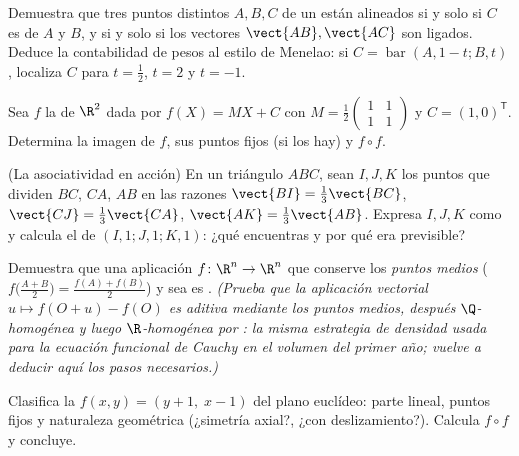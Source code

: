 \begin{exercise}[$\star$]\label{exo:b2:affine:2}
Demuestra que tres puntos distintos $A, B, C$ de un  están
alineados si y solo si $C$ es  de $A$ y $B$, y si y solo si
los vectores $\vect{AB}, \vect{AC}$ son ligados. Deduce la
contabilidad de pesos al estilo de Menelao: si $C =
\operatorname{bar}(A, 1 - t; B, t)$, localiza $C$ para $t =
\frac12$, $t = 2$ y $t = -1$.
\end{exercise}

\begin{exercise}[$\star$]\label{exo:b2:affine:3}
Sea $f$ la  de $\R^2$ dada por $f(X) = MX + C$ con $M
= \frac12\begin{pmatrix} 1 & 1\\ 1 & 1\end{pmatrix}$ y $C = (1,
0)^{\mathsf T}$. Determina la imagen de $f$, sus puntos fijos (si los
hay) y $f \circ f$.
\end{exercise}

\begin{exercise}[$\star\star$]\label{exo:b2:affine:4}
(La asociatividad en acción) En un triángulo $ABC$, sean $I, J, K$
los puntos que dividen $BC$, $CA$, $AB$ en las razones $\vect{BI} =
\frac13\vect{BC}$, $\vect{CJ} = \frac13\vect{CA}$, $\vect{AK} =
\frac13\vect{AB}$. Expresa $I, J, K$ como  y calcula el
 de $(I,1;J,1;K,1)$: ¿qué encuentras y por qué era
previsible?
\end{exercise}

\begin{exercise}[$\star\star$]\label{exo:b2:affine:5}
Demuestra que una aplicación $f \colon \R^n \to \R^n$ que conserve
los \emph{puntos medios} ($f\bigl(\frac{A+B}{2}\bigr) = \frac{f(A) +
f(B)}{2}$) y sea \emph{} es . \emph{(Prueba que la
aplicación vectorial $u \mapsto f(O + u) - f(O)$ es aditiva mediante
los puntos medios, después $\Q$-homogénea y luego $\R$-homogénea por
: la misma estrategia de densidad usada para la ecuación
funcional de Cauchy en el volumen del primer año; vuelve a deducir
aquí los pasos necesarios.)}
\end{exercise}

\begin{exercise}[$\star\star$]\label{exo:b2:affine:6}
Clasifica la  $f(x, y) = (y + 1,\; x - 1)$ del plano
euclídeo: parte lineal, puntos fijos y naturaleza geométrica (¿simetría
axial?, ¿con deslizamiento?). Calcula $f \circ f$ y concluye.
\end{exercise}

